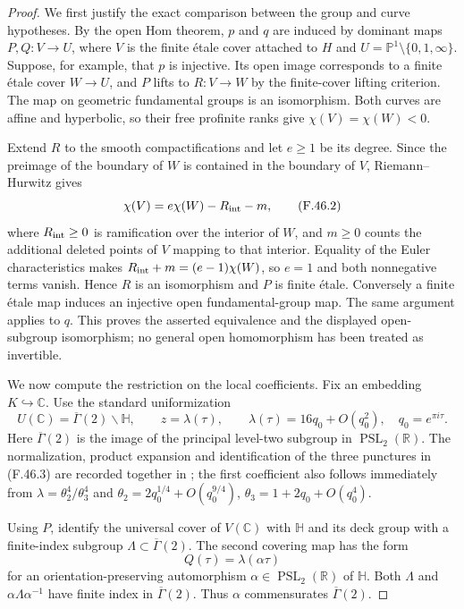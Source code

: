 \begin{proof}
We first justify the exact comparison between the group and
curve hypotheses. By the open Hom theorem, $p$ and $q$ are
induced by dominant maps $P,Q:V\to U$, where $V$ is the
finite \'etale cover attached to $H$ and
$U=\mathbb P^1\setminus\{0,1,\infty\}$. Suppose, for example,
that $p$ is injective. Its open image corresponds to a finite
\'etale cover $W\to U$, and $P$ lifts to $R:V\to W$ by the
finite-cover lifting criterion. The map on geometric fundamental
groups is an isomorphism. Both curves are affine and hyperbolic,
so their free profinite ranks give
$\chi(V)=\chi(W)<0$.

Extend $R$ to the smooth compactifications and let $e\ge1$
be its degree. Since the preimage of the boundary of $W$ is
contained in the boundary of $V$, Riemann--Hurwitz gives
\[
 \chi(V)=e\chi(W)-R_{\rm int}-m,
 \tag{F.46.2}
\]
where $R_{\rm int}\ge0$ is ramification over the interior of
$W$, and $m\ge0$ counts the additional deleted points of $V$
mapping to that interior. Equality of the Euler characteristics
makes $R_{\rm int}+m=(e-1)\chi(W)$, so $e=1$ and both
nonnegative terms vanish. Hence $R$ is an isomorphism and $P$
is finite \'etale. Conversely a finite \'etale map induces an
injective open fundamental-group map. The same argument applies
to $q$. This proves the asserted equivalence and the displayed
open-subgroup isomorphism; no general open homomorphism has
been treated as invertible.

We now compute the restriction on the local coefficients.
Fix an embedding $K\hookrightarrow\mathbb C$. Use the standard
uniformization
\[
 U(\mathbb C)=\overline\Gamma(2)\backslash\mathbb H,
 \qquad z=\lambda(\tau),\qquad
 \lambda(\tau)=16q_0+O(q_0^2),\quad q_0=e^{\pi i\tau}.
 \tag{F.46.3}
\]
Here $\overline\Gamma(2)$ is the image of the principal
level-two subgroup in $\operatorname{PSL}_2(\mathbb R)$.
The normalization, product expansion and identification of the
three punctures in (F.46.3) are recorded together in
\cite[\S1, equation (1.0.2), p.~628]{F-CalegariDimitrovTang};
the first coefficient also follows immediately from
$\lambda=\theta_2^4/\theta_3^4$ and
$\theta_2=2q_0^{1/4}+O(q_0^{9/4})$,
$\theta_3=1+2q_0+O(q_0^4)$.

Using $P$, identify the universal cover of $V(\mathbb C)$
with $\mathbb H$ and its deck group with a finite-index
subgroup $\Lambda\subset\overline\Gamma(2)$. The second
covering map has the form
\[
                  Q(\tau)=\lambda(\alpha\tau)
\]
for an orientation-preserving automorphism
$\alpha\in\operatorname{PSL}_2(\mathbb R)$ of $\mathbb H$.
Both $\Lambda$ and $\alpha\Lambda\alpha^{-1}$ have finite
index in $\overline\Gamma(2)$. Thus $\alpha$ commensurates
$\overline\Gamma(2)$.


\end{proof}
